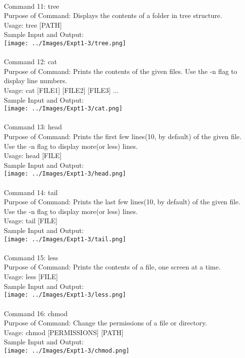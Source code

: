 \documentclass[10pt,a4paper]{report}
\begin{document}
\\
Command 11: tree\\
Purpose of Command: Displays the contents of a folder in tree structure.\\
Usage: tree [PATH]\\
Sample Input and Output: \\
\texttt{[image: ../Images/Expt1-3/tree.png]}\\
\pagebreak
\\
Command 12: cat\\
Purpose of Command: Prints the contents of the given files. Use the -n flag to display line numbers.\\
Usage: cat [FILE1] [FILE2] [FILE3] ...\\
Sample Input and Output: \\
\texttt{[image: ../Images/Expt1-3/cat.png]}\\
\\
Command 13: head\\
Purpose of Command: Prints the first few lines(10, by default) of the given file. Use the -n flag to display more(or less) lines.\\
Usage: head [FILE]\\
Sample Input and Output: \\
\texttt{[image: ../Images/Expt1-3/head.png]}\\
\pagebreak
\\
Command 14: tail\\
Purpose of Command: Prints the last few lines(10, by default) of the given file. Use the -n flag to display more(or less) lines.\\
Usage: tail [FILE]\\
Sample Input and Output: \\
\texttt{[image: ../Images/Expt1-3/tail.png]}\\
\\
Command 15: less\\
Purpose of Command: Prints the contents of a file, one screen at a time.\\
Usage: less [FILE]\\
Sample Input and Output: \\
\texttt{[image: ../Images/Expt1-3/less.png]}\\
\pagebreak
\\
Command 16: chmod\\
Purpose of Command: Change the permissions of a file or directory.\\
Usage: chmod [PERMISSIONS] [PATH]\\
Sample Input and Output: \\
\texttt{[image: ../Images/Expt1-3/chmod.png]}\\
\\
\end{document}
